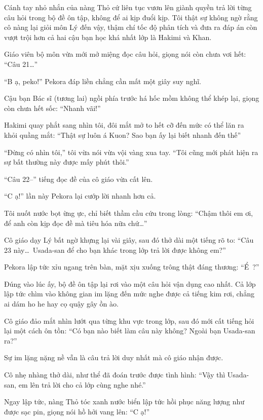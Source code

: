 \documentclass[../main.tex]{subfiles}
\begin{document}
Cánh tay nhỏ nhắn của nàng Thỏ cứ liên tục vươn lên giành quyền trả lời từng câu hỏi trong bộ đề ôn tập, không để ai kịp đuổi kịp. Tôi thật sự không ngờ rằng cô nàng lại giỏi môn Lý đến vậy, thậm chí tốc độ phân tích và đưa ra đáp án còn vượt trội hơn cả hai cậu bạn học khá nhất lớp là Hakimi và Khan.

Giáo viên bộ môn vừa mới mở miệng đọc câu hỏi, giọng nói còn chưa vơi hết: ``Câu 21\dots''

``B ạ, peko!'' Pekora đáp liền chẳng cần mất một giây suy nghĩ.

Cậu bạn Bác sĩ (tương lai) ngồi phía trước há hốc mồm không thể khép lại, giọng còn chưa hết sốc: ``Nhanh vãi!''

Hakimi quay phắt sang nhìn tôi, đôi mắt mở to hết cỡ đến mức có thể lăn ra khỏi quầng mắt: ``Thật sự luôn á Kuon? Sao bạn ấy lại biết nhanh đến thế''

``Đừng có nhìn tôi,'' tôi vừa nói vừa vội vàng xua tay. ``Tôi cũng mới phát hiện ra sự bất thường này được mấy phút thôi.''

``Câu 22--'' tiếng đọc đề của cô giáo vừa cất lên.

``C ạ!'' lần này Pekora lại cướp lời nhanh hơn cả.

Tôi nuốt nước bọt ừng ực, chỉ biết thầm cầu cứu trong lòng: ``Chậm thôi em ơi, để anh còn kịp đọc đề mà tiêu hóa nữa chứ\dots''

Cô giáo dạy Lý bất ngờ khựng lại vài giây, sau đó thở dài một tiếng rõ to: ``Câu 23 này\dots\ Usada-san để cho bạn khác trong lớp trả lời được không em?''

Pekora lập tức xỉu ngang trên bàn, mặt xịu xuống trông thật đáng thương: ``Ể~?''

Đúng vào lúc ấy, bộ đề ôn tập lại rơi vào một câu hỏi vận dụng cao nhất. Cả lớp lập tức chìm vào không gian im lặng đến mức nghe được cả tiếng kim rơi, chẳng ai dám ho he hay cọ quậy gây ồn ào.

Cô giáo đảo mắt nhìn lướt qua từng khu vực trong lớp, sau đó mới cất tiếng hỏi lại một cách ôn tồn: ``Có bạn nào biết làm câu này không? Ngoài bạn Usada-san ra?''

Sự im lặng nặng nề vẫn là câu trả lời duy nhất mà cô giáo nhận được.

Cô nhẹ nhàng thở dài, như thể đã đoán trước được tình hình: ``Vậy thì Usada-san, em lên trả lời cho cả lớp cùng nghe nhé.''

Ngay lập tức, nàng Thỏ tóc xanh nước biển lập tức hồi phục năng lượng như được sạc pin, giọng nói hồ hởi vang lên: ``C ạ!''
\end{document}
